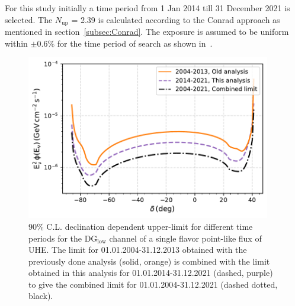 For this study initially a time period from 1 Jan 2014 till 31 December 2021 is selected. The $N_{\text{up}}$ = 2.39 is calculated according to the Conrad approach as mentioned in section~\ref{subsec:Conrad}. The exposure is assumed to be uniform within $\pm 0.6\%$ for the time period of search as shown in~\cite{PierreAuger:2017pzq}. 

\begin{figure}[t!]
  \centering
  \includegraphics[width=0.95\textwidth]{thesis_figures/PointLimits/Point_comp_combined.pdf}
  \caption{90\% C.L. declination dependent upper-limit for different time periods for the DG$_{\text{low}}$ channel of a single flavor point-like flux of UHE. The limit for 01.01.2004-31.12.2013 obtained with the previously done analysis (solid, orange) is combined with the limit obtained in this analysis for 01.01.2014-31.12.2021 (dashed, purple) to give the combined limit for 01.01.2004-31.12.2021 (dashed dotted, black).}
  \label{fig:Dec_limit_comb1}
\end{figure}


